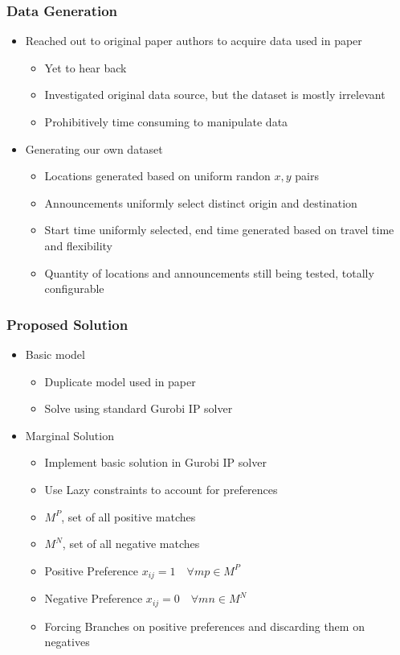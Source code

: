 \documentclass{beamer}
\begin{document}
\begin{frame}
\frametitle{Data Generation}
\begin{itemize}
\item Reached out to original paper authors to acquire data used in paper
\begin{itemize}
\item Yet to hear back
\item Investigated original data source, but the dataset is mostly irrelevant
\item Prohibitively time consuming to manipulate data
\end{itemize}
\item Generating our own dataset
\begin{itemize}
\item Locations generated based on uniform randon \(x,y\) pairs
\item Announcements uniformly select distinct origin and destination
\item Start time uniformly selected, end time generated based on travel time and flexibility
\item Quantity of locations and announcements still being tested, totally configurable
\end{itemize}
\end{itemize}
\end{frame}

\begin{frame}
	\frametitle{Proposed Solution}
    \begin{itemize}
    	\item Basic model
    		\begin{itemize}
    			\item Duplicate model used in paper 
                \item Solve using standard Gurobi IP solver 
    		\end{itemize}
		\item Marginal Solution
    		\begin{itemize}
    			\item Implement basic solution in Gurobi IP solver  
                \item Use Lazy constraints to account for preferences
                \item \(M^P\), set of all positive matches
                \item \(M^N\), set of all negative matches
                \item Positive Preference \(x_{ij} = 1 \quad \forall mp \in M^P\)
                \item Negative Preference \(x_{ij} = 0 \quad \forall mn \in M^N\)
				\item Forcing Branches on positive preferences and discarding them on negatives
    		\end{itemize}
    \end{itemize}

\end{frame}
\end{document}
